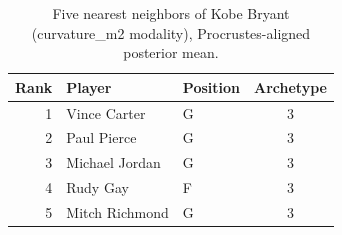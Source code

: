 \begin{table}[htbp]
  \centering\small
  \begin{tabular}{rllc}
    \toprule
    Rank & Player & Position & Archetype \\
    \midrule
    1 & Vince Carter & G & 3 \\
    2 & Paul Pierce & G & 3 \\
    3 & Michael Jordan & G & 3 \\
    4 & Rudy Gay & F & 3 \\
    5 & Mitch Richmond & G & 3 \\
    \bottomrule
  \end{tabular}
  \caption{Five nearest neighbors of Kobe Bryant (curvature_m2 modality), Procrustes-aligned posterior mean.}
  \label{tab:Kobe_Bryant_neighbors_curvature_m2}
\end{table}

